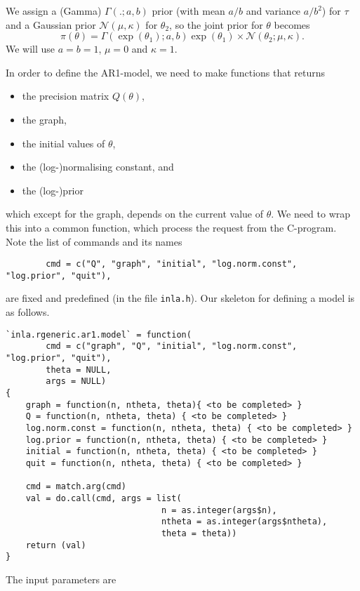 \documentclass[a4paper,11pt]{article}
\begin{document}
We assign a (Gamma) $\Gamma(.; a,b)$ prior (with mean $a/b$ and
variance $a/b^{2}$) for $\tau$ and a Gaussian prior ${\mathcal
    N}(\mu,\kappa)$ for $\theta_{2}$, so the joint prior for $\theta$
becomes
\begin{displaymath}
    \pi(\theta) = \Gamma(\exp(\theta_1); a,b) \exp(\theta_1) \times
    {\mathcal N}(\theta_{2}; \mu, \kappa).
\end{displaymath}
We will use $a=b=1$, $\mu=0$ and $\kappa=1$.

In order to define the AR1-model, we need to make functions that
returns
\begin{itemize}
\item the precision matrix $Q(\theta)$,
\item the graph,
\item the initial values of $\theta$,
\item the (log-)normalising constant, and
\item the (log-)prior
\end{itemize}
which except for the graph, depends on the current value of
$\theta$. We need to wrap this into a common function, which process
the request from the C-program. Note the 
list of commands and its names
\begin{verbatim}
        cmd = c("Q", "graph", "initial", "log.norm.const", "log.prior", "quit"),
\end{verbatim}
are fixed and predefined (in the file \texttt{inla.h}).  Our skeleton
for defining a model is as follows.
\begin{verbatim}
`inla.rgeneric.ar1.model` = function(
        cmd = c("graph", "Q", "initial", "log.norm.const", "log.prior", "quit"),
        theta = NULL,
        args = NULL)
{
    graph = function(n, ntheta, theta){ <to be completed> }
    Q = function(n, ntheta, theta) { <to be completed> }
    log.norm.const = function(n, ntheta, theta) { <to be completed> }
    log.prior = function(n, ntheta, theta) { <to be completed> }
    initial = function(n, ntheta, theta) { <to be completed> }
    quit = function(n, ntheta, theta) { <to be completed> }

    cmd = match.arg(cmd)
    val = do.call(cmd, args = list(
                               n = as.integer(args$n),
                               ntheta = as.integer(args$ntheta), 
                               theta = theta))
    return (val)
}
\end{verbatim}
The input parameters are
\end{document}
